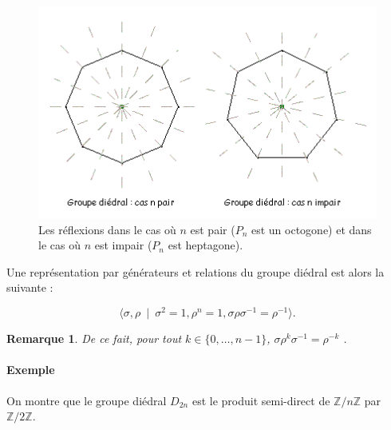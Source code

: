 \documentclass[french]{report}
\newtheorem*{remark}{Remarque}
\begin{document}
\begin{figure}[h!]
  \centering
  \includegraphics[scale=0.5]{figures/diedral.png}
  \caption{Les réflexions dans le cas où $n$ est pair ($P_n$ est un octogone) et dans le cas où $n$ est impair ($P_n$ est heptagone).}
  \label{diedral}
\end{figure}

Une représentation par générateurs et relations du groupe diédral est alors la suivante :

$$ \langle \sigma, \rho \ \mid \ \sigma ^2 = 1, \rho ^{n} = 1, \sigma \rho \sigma ^{-1}  = \rho ^{-1}   \rangle. $$


\begin{remark}
  De ce fait, pour tout $k \in \{ 0, \dots, n-1 \} $, $\sigma \rho ^{k}\sigma ^{-1} = \rho ^{-k} $ .
\end{remark}

\paragraph{Exemple}

On montre que le groupe diédral $D _{2n}$ est le produit semi-direct de $\mathbb{Z}/{ n }\mathbb{Z}$ par $\mathbb{Z}/{ 2 }\mathbb{Z}$.
\end{document}
